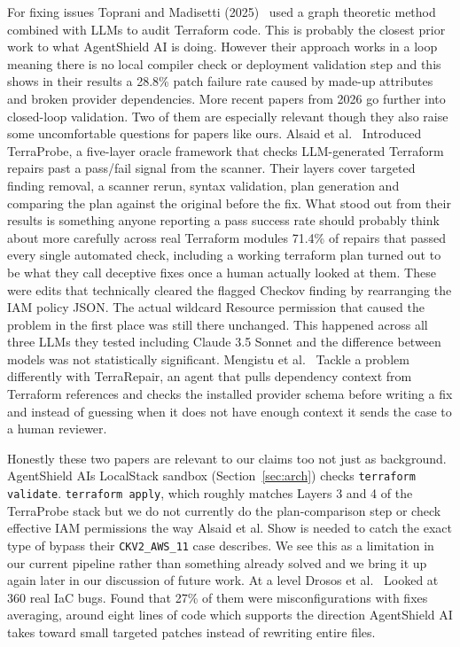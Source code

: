 \documentclass[runningheads]{llncs}
\begin{document}
For fixing issues Toprani and Madisetti (2025)~\cite{toprani2025automated} used a graph theoretic method combined with LLMs to audit Terraform code. This is probably the closest prior work to what AgentShield AI is doing. However their approach works in a loop meaning there is no local compiler check or deployment validation step and this shows in their results a 28.8\% patch failure rate caused by made-up attributes and broken provider dependencies. More recent papers from 2026 go further into closed-loop validation. Two of them are especially relevant though they also raise some uncomfortable questions for papers like ours. Alsaid et al.~\cite{alsaid2026terraprobe} Introduced TerraProbe, a five-layer oracle framework that checks LLM-generated Terraform repairs past a pass/fail signal from the scanner. Their layers cover targeted finding removal, a scanner rerun, syntax validation, plan generation and comparing the plan against the original before the fix. What stood out from their results is something anyone reporting a pass success rate should probably think about more carefully across real Terraform modules 71.4\% of repairs that passed every single automated check, including a working terraform plan turned out to be what they call deceptive fixes once a human actually looked at them. These were edits that technically cleared the flagged Checkov finding by rearranging the IAM policy JSON. The actual wildcard Resource permission that caused the problem in the first place was still there unchanged. This happened across all three LLMs they tested including Claude 3.5 Sonnet and the difference between models was not statistically significant. Mengistu et al.~\cite{mengistu2026terrarepair} Tackle a problem differently with TerraRepair, an agent that pulls dependency context from Terraform references and checks the installed provider schema before writing a fix and instead of guessing when it does not have enough context it sends the case to a human reviewer.

Honestly these two papers are relevant to our claims too not just as background. AgentShield AIs LocalStack sandbox (Section~\ref{sec:arch}) checks \texttt{terraform validate}. \texttt{terraform apply}, which roughly matches Layers 3 and 4 of the TerraProbe stack but we do not currently do the plan-comparison step or check effective IAM permissions the way Alsaid et al. Show is needed to catch the exact type of bypass their \texttt{CKV2\_AWS\_11} case describes. We see this as a limitation in our current pipeline rather than something already solved and we bring it up again later in our discussion of future work. At a level Drosos et al.~\cite{drosos2024understanding} Looked at 360 real IaC bugs. Found that 27\% of them were misconfigurations with fixes averaging, around eight lines of code which supports the direction AgentShield AI takes toward small targeted patches instead of rewriting entire files.
\end{document}
